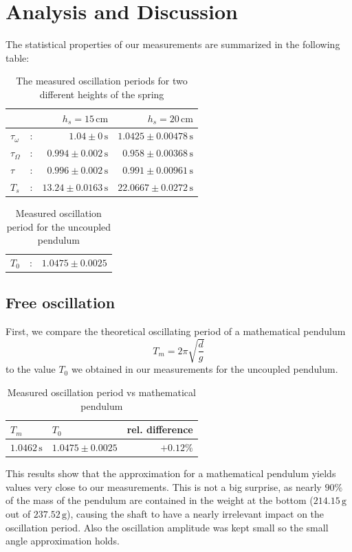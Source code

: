 \documentclass{scrreprt}
\newcommand{\unit}[1]{\ensuremath{\, \mathrm{#1}}}
\begin{document}
\section{Analysis and Discussion}
The statistical properties of our measurements are summarized in the following table:

\begin{table}[H]
\centering
	\begin{tabular}{lcrr}
	&&$h_s = 15\unit{cm}$&$h_s = 20\unit{cm}$\\
	\hline	
	$\tau_\omega$&:&$1.04\pm 0 \unit{s}$&$1.0425\pm 0.00478\unit{s}$\\	
	$\tau_\Omega$&:&$0.994\pm 0.002 \unit{s}$&$0.958\pm 0.00368\unit{s}$\\
	$\tau$&:&$0.996\pm 0.002 \unit{s}$&$0.991\pm 0.00961\unit{s}$\\
	$T_s$&:&$13.24\pm 0.0163 \unit{s}$&$22.0667\pm 0.0272\unit{s}$\\
	\end{tabular}
	\caption{The measured oscillation periods for two different heights of the spring}
\end{table}
\begin{table}[H]
	\centering
	\begin{tabular}{lcr}
		$T_0$&:&$1.0475	\pm 0.0025$
	\end{tabular}
	\caption{Measured oscillation period for the uncoupled pendulum}
\end{table}

\subsection{Free oscillation}
First, we compare the theoretical oscillating period of a mathematical pendulum 
\begin{equation}
	T_m=2\pi\sqrt{\frac{d}{g}}
\end{equation}
to the value $T_0$ we obtained in our measurements for the uncoupled pendulum.
\begin{table}[H]
	\centering
	\begin{tabular}{llr}
		$T_m$&$T_0$&rel. difference\\ \hline
		$1.0462 \unit{s}$&$1.0475 \pm 0.0025$ & $+0.12\%$
	\end{tabular}
	\caption{Measured oscillation period vs mathematical pendulum}
\end{table}
This results show that the approximation for a mathematical pendulum yields values very close to our measurements. This is not a big surprise, as nearly $90\%$ of the mass of the pendulum are contained in the weight at the bottom ($214.15\unit{g}$ out of $237.52\unit{g}$), causing the shaft to have a nearly irrelevant impact on the oscillation period. Also the oscillation amplitude was kept small so the small angle approximation holds.
\end{document}
